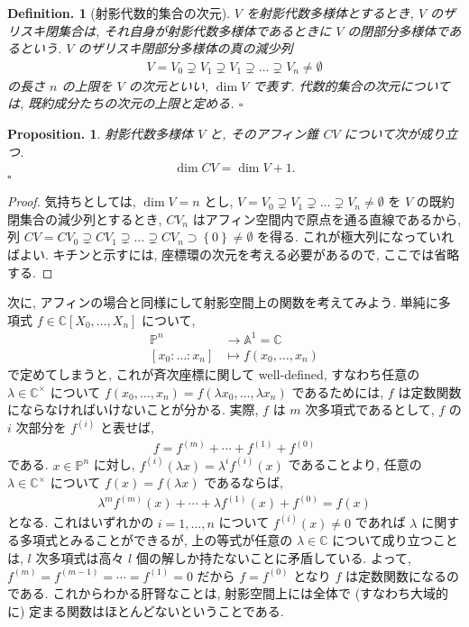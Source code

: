 \documentclass[openany, a4paper, oneside]{jsbook}
\theoremstyle{break}
\newtheorem{prop}[thm]{Proposition.}
\theoremstyle{breakdefn}
\newtheorem{defn}[thm]{Definition.}
\newcommand{\cbk}[1]{\left\{#1\right\}}
\newcommand{\fin}{\hfill $\square$ \par}
\newcommand{\map}{\longrightarrow}
\begin{document}
\begin{defn}[射影代数的集合の次元]
$V$ を射影代数多様体とするとき, $V$ のザリスキ閉集合は, それ自身が射影代数多様体であるときに $V$ の閉部分多様体であるという.
$V$ のザリスキ閉部分多様体の真の減少列
\begin{align}
 V=V_0 \supsetneq V_1 \supsetneq V_1 \supsetneq \dots \supsetneq V_n \neq \emptyset
\end{align}
の長さ $n$ の上限を $V$ の次元といい,  $\dim V$ で表す.
代数的集合の次元については, 既約成分たちの次元の上限と定める. \fin
\end{defn}
\begin{prop}
射影代数多様体 $V$ と, そのアフィン錐 $CV$ について次が成り立つ.
\begin{align}
 \dim CV
 =
 \dim V + 1.
\end{align}
\fin
\end{prop}
\begin{proof}
気持ちとしては, $\dim V = n$ とし,
$V=V_0 \supsetneq V_1 \supsetneq \dots \supsetneq V_n \neq \emptyset$ を $V$ の既約閉集合の減少列とするとき,
$CV_n$ はアフィン空間内で原点を通る直線であるから, 列
$CV=CV_0 \supsetneq CV_1 \supsetneq \dots \supsetneq CV_n \supset \cbk{0} \neq \emptyset$ を得る.
これが極大列になっていればよい.
キチンと示すには, 座標環の次元を考える必要があるので, ここでは省略する.
\end{proof}

次に, アフィンの場合と同様にして射影空間上の関数を考えてみよう.
単純に多項式 $f \in \mathbb{C}[X_0,\dots,X_n]$ について,
\begin{align}
 \mathbb{P}^n
 &\map
 \mathbb{A}^1
 = \mathbb{C} \\
 [x_0:\dots:x_n]
 &\longmapsto
 f(x_0,\dots,x_n)
\end{align}
で定めてしまうと, これが斉次座標に関して well-defined,
すなわち任意の $\lambda \in \mathbb{C}^{\times}$ について
$f(x_0,\dots,x_n) = f (\lambda x_0,\dots,\lambda x_n)$ であるためには,
$f$ は定数関数にならなければいけないことが分かる.
実際, $f$ は $m$ 次多項式であるとして, $f$ の $i$ 次部分を $f^{(i)}$ と表せば,
\begin{align}
 f
 =
 f^{(m)} + \cdots + f^{(1)} + f^{(0)}
\end{align}
である.
$x \in \mathbb{P}^n$ に対し, $f^{(i)}(\lambda x) = \lambda^i f^{(i)}(x)$ であることより,
任意の $\lambda \in \mathbb{C}^{\times}$ について $f (x) = f (\lambda x)$ であるならば,
\begin{align}
 \lambda^m f^{(m)}(x) + \cdots + \lambda f^{(1)}(x) + f^{(0)}
 =
 f (x)
\end{align}
となる.
これはいずれかの $i =1,\dots,n$ について $f^{(i)}(x) \neq 0$ であれば $\lambda$ に関する多項式とみることができるが,
上の等式が任意の $\lambda \in \mathbb{C}$ について成り立つことは,
$l$ 次多項式は高々 $l$ 個の解しか持たないことに矛盾している.
よって, $f^{(m)} = f^{(m-1)} = \cdots = f^{(1)} = 0$ だから  $f=f^{(0)}$ となり $f$ は定数関数になるのである.
これからわかる肝腎なことは, 射影空間上には全体で (すなわち大域的に) 定まる関数はほとんどないということである.
\end{document}
